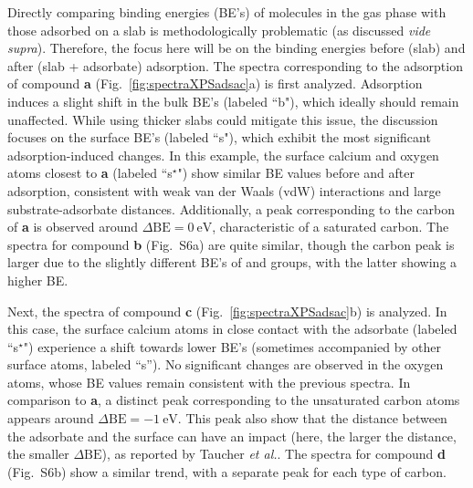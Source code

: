 \documentclass[%
aip,
amsmath,amssymb,
preprint,%
jcp,
showkeys,
]{revtex4-2}
\def\dbe{\ensuremath{\Delta\text{BE}}}
\begin{document}
Directly comparing binding energies (BE's) of molecules in the gas phase with those adsorbed on a slab is methodologically problematic (as discussed \textit{vide supra}). Therefore, the focus here will be on the binding energies before (slab) and after (slab + adsorbate) adsorption.
The spectra corresponding to the adsorption of compound \textbf{a} (Fig.~\ref{fig:spectraXPSadsac}a) is first analyzed. Adsorption induces a slight shift in the bulk BE's (labeled ``b"), which ideally should remain unaffected. While using thicker slabs could mitigate this issue, the discussion  focuses on the surface BE's (labeled ``s"), which exhibit the most significant adsorption-induced changes. In this example, the surface calcium and oxygen atoms closest to \textbf{a} (labeled ``s$^\star$") show similar BE values before and after adsorption, consistent with weak van der Waals (vdW) interactions and large substrate-adsorbate distances. Additionally, a peak corresponding to the carbon of \textbf{a} is observed around $\dbe = \SI{0}{\electronvolt}$, characteristic of a saturated carbon. The spectra for compound \textbf{b} (Fig.~S6a) are quite similar, though the carbon peak is larger due to the slightly different BE's of  and  groups, with the latter showing a higher BE.


Next, the spectra of compound \textbf{c} (Fig.~\ref{fig:spectraXPSadsac}b) is analyzed. In this case, the surface calcium atoms in close contact with the adsorbate (labeled ``s$^\star$") experience a shift towards lower BE's (sometimes accompanied by other surface atoms,  labeled ``s''). No significant changes are observed in the oxygen atoms, whose BE values remain consistent with the previous spectra. In comparison to \textbf{a}, a distinct peak corresponding to the unsaturated carbon atoms appears around $\dbe = \SI{-1}{\electronvolt}$. This peak also show that the distance between the adsorbate and the surface can have an impact (here, the larger the distance, the smaller \dbe{}), as reported by Taucher \emph{et al.}\cite{taucherFinalStateSimulationsCoreLevel2020}. The spectra for compound \textbf{d} (Fig.~S6b) show a similar trend, with a separate peak for each type of carbon.


\clearpage
\end{document}
